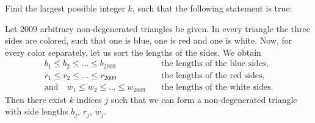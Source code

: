 Find the largest possible integer $k$, such that the following statement is true:

Let $2009$ arbitrary non-degenerated triangles be given. In every triangle the three sides are colored, such that one is blue, one is red and one is white. Now, for every color separately, let us sort the lengths of the sides. We obtain
\[
\begin{aligned}
b_1 \leq b_2 \leq \ldots \leq b_{2009} &\quad \text{the lengths of the blue sides,} \\
r_1 \leq r_2 \leq \ldots \leq r_{2009} &\quad \text{the lengths of the red sides,} \\
\text{and} \quad w_1 \leq w_2 \leq \ldots \leq w_{2009} &\quad \text{the lengths of the white sides.}
\end{aligned}
\]
Then there exist $k$ indices $j$ such that we can form a non-degenerated triangle with side lengths $b_j$, $r_j$, $w_j$.
